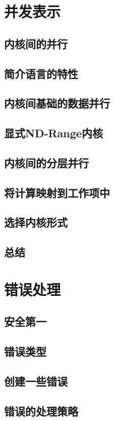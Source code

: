 \documentclass[11pt,a4paper,UTF8]{ctexart}
\begin{document}
	\section{并发表示}
		\subsection{内核间的并行}
		\subsection{简介语言的特性}
		\subsection{内核间基础的数据并行}
		\subsection{显式ND-Range内核}
		\subsection{内核间的分层并行}
		\subsection{将计算映射到工作项中}
		\subsection{选择内核形式}
		\subsection{总结}
	\section{错误处理}
		\subsection{安全第一}
		\subsection{错误类型}
		\subsection{创建一些错误}
		\subsection{错误的处理策略}
\end{document}
